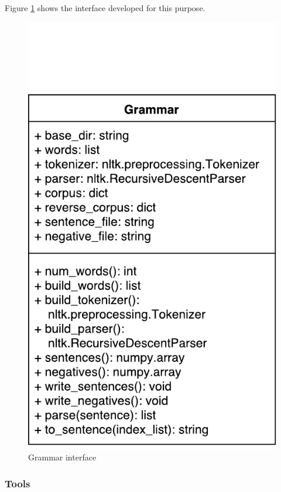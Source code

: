 \documentclass[12pt]{article}
\begin{document}
Figure \ref{fig:grammar} shows the interface developed for this purpose.
\begin{figure}[ht]
    \centering
    \includegraphics[trim={0 0 0 2.45cm},scale=0.7,clip]{img/grammar.pdf}
    \caption{Grammar interface}
    \label{fig:grammar}
\end{figure}

\subsubsection{Tools}
\end{document}

